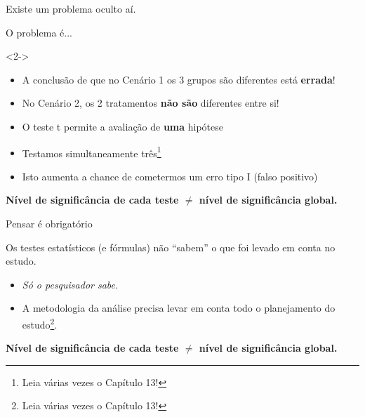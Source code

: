 \documentclass{beamer}
\begin{document}
\begin{frame}{}
  \begin{center}
    Existe um problema oculto aí.
  \end{center}
\end{frame}

\begin{frame}{}
  \begin{center}
    O problema é...
  \end{center}
  \begin{block}{}<2->
    \begin{itemize}
      \footnotesize
    \item A conclusão de que no Cenário 1 os 3 grupos são diferentes está {\bf errada}!
    \item No Cenário 2, os 2 tratamentos {\bf não são} diferentes entre si!
    \end{itemize}
  \end{block}
  \bigskip
  \begin{itemize}
    \scriptsize
  \item<3-> O teste t permite a avaliação de {\bf uma} hipótese
  \item<3-> Testamos simultaneamente três\footnote{Leia várias vezes o Capítulo 13!}
  \item<3-> Isto aumenta a chance de cometermos um erro tipo I (falso positivo)
  \end{itemize}
  \vfill
  \begin{block}{}
    \footnotesize
    {\bf Nível de significância de cada teste $\ne$ nível de significância global.}
  \end{block}
\end{frame}

\begin{frame}{\small Pensar é obrigatório}
  \begin{block}{}
    \small
    Os testes estatísticos (e fórmulas) não ``sabem'' o que foi levado em conta no estudo.
  \end{block}
  \bigskip
  \bigskip
  \begin{itemize}
    \small
  \item {\em Só o pesquisador sabe.}
  \item A metodologia da análise precisa levar em conta todo o planejamento do estudo\footnote{Leia várias vezes o Capítulo 13!}.
  \end{itemize}
  \bigskip
  \bigskip
  \bigskip
  \begin{block}{}
    \footnotesize
    {\bf Nível de significância de cada teste $\ne$ nível de significância global.}
  \end{block}
\end{frame}
\end{document}
